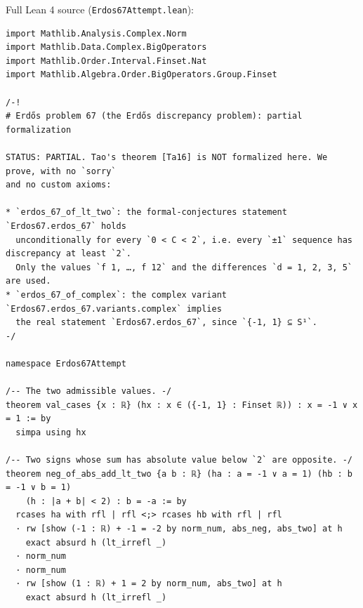 Full Lean 4 source (\texttt{Erdos67Attempt.lean}):
\begin{verbatim}
import Mathlib.Analysis.Complex.Norm
import Mathlib.Data.Complex.BigOperators
import Mathlib.Order.Interval.Finset.Nat
import Mathlib.Algebra.Order.BigOperators.Group.Finset

/-!
# Erdős problem 67 (the Erdős discrepancy problem): partial formalization

STATUS: PARTIAL. Tao's theorem [Ta16] is NOT formalized here. We prove, with no `sorry`
and no custom axioms:

* `erdos_67_of_lt_two`: the formal-conjectures statement `Erdos67.erdos_67` holds
  unconditionally for every `0 < C < 2`, i.e. every `±1` sequence has discrepancy at least `2`.
  Only the values `f 1, …, f 12` and the differences `d = 1, 2, 3, 5` are used.
* `erdos_67_of_complex`: the complex variant `Erdos67.erdos_67.variants.complex` implies
  the real statement `Erdos67.erdos_67`, since `{-1, 1} ⊆ S¹`.
-/

namespace Erdos67Attempt

/-- The two admissible values. -/
theorem val_cases {x : ℝ} (hx : x ∈ ({-1, 1} : Finset ℝ)) : x = -1 ∨ x = 1 := by
  simpa using hx

/-- Two signs whose sum has absolute value below `2` are opposite. -/
theorem neg_of_abs_add_lt_two {a b : ℝ} (ha : a = -1 ∨ a = 1) (hb : b = -1 ∨ b = 1)
    (h : |a + b| < 2) : b = -a := by
  rcases ha with rfl | rfl <;> rcases hb with rfl | rfl
  · rw [show (-1 : ℝ) + -1 = -2 by norm_num, abs_neg, abs_two] at h
    exact absurd h (lt_irrefl _)
  · norm_num
  · norm_num
  · rw [show (1 : ℝ) + 1 = 2 by norm_num, abs_two] at h
    exact absurd h (lt_irrefl _)


\end{verbatim}
